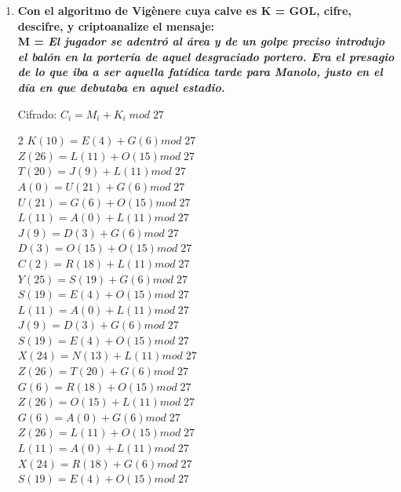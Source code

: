 \documentclass{article}
\begin{document}
\begin{enumerate}
 
 
\item \textbf{Con el algoritmo de Vigènere cuya calve es K = GOL, cifre, descifre, y criptoanalize el mensaje: \\ M = \emph{El jugador se adentró al área y de un golpe preciso introdujo el balón en la portería de aquel desgraciado portero. Era el presagio de lo que iba a ser aquella fatídica tarde para Manolo, justo en el día en que debutaba en aquel estadio.}}  


Cifrado: $C_{i} = M_{i} + K_{i} \;  mod \; 27$


\begin{multicols}{2}
$K (10) = E(4) + G (6) mod \; 27$ \\
$Z (26) = L(11) + O (15) mod \; 27$ \\
$T (20) = J(9) + L (11) mod \; 27$ \\
$A (0) = U(21) + G (6) mod \; 27$ \\
$U (21) = G(6) + O (15) mod \; 27$ \\
$L (11) = A(0) + L (11) mod \; 27$ \\
$J (9) = D(3) + G (6) mod \; 27$ \\
$D (3) = O(15) + O (15) mod \; 27$ \\
$C (2) = R(18) + L (11) mod \; 27$ \\
$Y (25) = S(19) + G (6) mod \; 27$ \\
$S (19) = E(4) + O (15) mod \; 27$ \\
$L (11) = A(0) + L (11) mod \; 27$ \\
$J (9) = D(3) + G (6) mod \; 27$ \\
$S (19) = E(4) + O (15) mod \; 27$ \\
$X (24) = N(13) + L (11) mod \; 27$ \\
$Z (26) = T(20) + G (6) mod \; 27$ \\
$G (6) = R(18) + O (15) mod \; 27$ \\
$Z (26) = O(15) + L (11) mod \; 27$ \\
$G (6) = A(0) + G (6) mod \; 27$ \\
$Z (26) = L(11) + O (15) mod \; 27$ \\
$L (11) = A(0) + L (11) mod \; 27$ \\
$X (24) = R(18) + G (6) mod \; 27$ \\
$S (19) = E(4) + O (15) mod \; 27$ \\

\end{multicols}
\end{enumerate}
\end{document}

